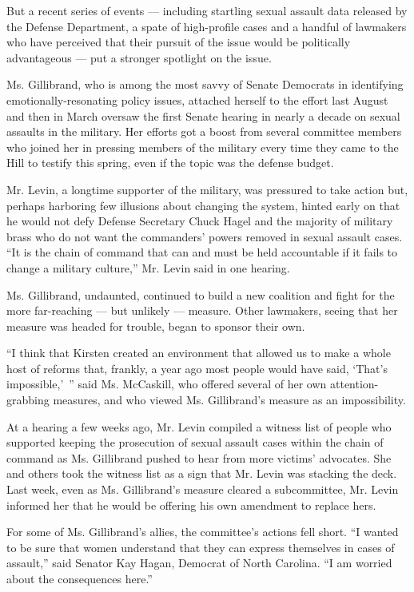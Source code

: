 But a recent series of events --- including startling sexual assault
data released by the Defense Department, a spate of high-profile cases
and a handful of lawmakers who have perceived that their pursuit of the
issue would be politically advantageous --- put a stronger spotlight on
the issue.

Ms. Gillibrand, who is among the most savvy of Senate Democrats in
identifying emotionally-resonating policy issues, attached herself to
the effort last August and then in March oversaw the first Senate
hearing in nearly a decade on sexual assaults in the military. Her
efforts got a boost from several committee members who joined her in
pressing members of the military every time they came to the Hill to
testify this spring, even if the topic was the defense budget.

Mr. Levin, a longtime supporter of the military, was pressured to take
action but, perhaps harboring few illusions about changing the system,
hinted early on that he would not defy Defense Secretary Chuck Hagel and
the majority of military brass who do not want the commanders' powers
removed in sexual assault cases. ``It is the chain of command that can
and must be held accountable if it fails to change a military culture,''
Mr. Levin said in one hearing.

Ms. Gillibrand, undaunted, continued to build a new coalition and fight
for the more far-reaching --- but unlikely --- measure. Other lawmakers,
seeing that her measure was headed for trouble, began to sponsor their
own.

``I think that Kirsten created an environment that allowed us to make a
whole host of reforms that, frankly, a year ago most people would have
said, `That's impossible,'~'' said Ms. McCaskill, who offered several of
her own attention-grabbing measures, and who viewed Ms. Gillibrand's
measure as an impossibility.

At a hearing a few weeks ago, Mr. Levin compiled a witness list of
people who supported keeping the prosecution of sexual assault cases
within the chain of command as Ms. Gillibrand pushed to hear from more
victims' advocates. She and others took the witness list as a sign that
Mr. Levin was stacking the deck. Last week, even as Ms. Gillibrand's
measure cleared a subcommittee, Mr. Levin informed her that he would be
offering his own amendment to replace hers.

For some of Ms. Gillibrand's allies, the committee's actions fell short.
``I wanted to be sure that women understand that they can express
themselves in cases of assault,'' said Senator Kay Hagan, Democrat of
North Carolina. ``I am worried about the consequences here.''

